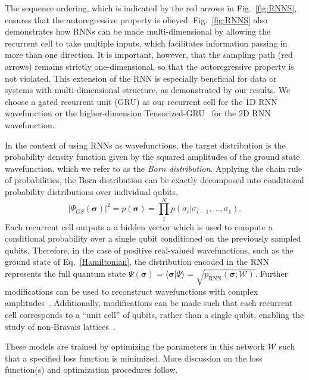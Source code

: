 \documentclass[twocolumn,
                showpacs,
                nofootinbib,
                nobibnotes,
                aps,
                superscriptaddress,
                amssymb,
                amsmath,
                floatfix,
                reprint,
                prx, 
                notitlepage,
                showkeys,
                10pt,
		]{revtex4-2}
\begin{document}
The sequence ordering, which is indicated by the red arrows in Fig.~\ref{fig:RNNS}, ensures that the autoregressive property is obeyed.
Fig.~\ref{fig:RNNS} also demonstrates how RNNs can be made multi-dimensional by allowing the recurrent cell to take multiple inputs, which facilitates information passing in more than one direction. It is important, however, that the sampling path (red arrows) remains strictly one-dimensional, so that the autoregressive property is not violated.
This extension of the RNN is especially beneficial for data or systems with multi-dimensional structure, as demonstrated by our results. 
We choose a gated recurrent unit (GRU) as our recurrent cell \cite{cho-etal-2014-learning} for the 1D RNN wavefunction or the higher-dimension Tensorized-GRU~\cite{hibat2022supplementing} for the 2D RNN wavefunction.

In the context of using RNNs as wavefunctions, the target distribution is the probability density function given by the squared amplitudes of the ground state wavefunction, which we refer to as the \emph{Born distribution}. Applying the chain rule of probabilities, the Born distribution can be exactly decomposed into conditional probability distributions over individual qubits, 
\begin{equation}
    \vert\Psi_{GS}(\boldsymbol{\sigma})\vert^2 = p(\boldsymbol{\sigma}) = \prod_i^N p(\sigma_i\vert\sigma_{i-1},\dots,\sigma_1).
\label{ProbChainRuleSpins}
\end{equation}
Each recurrent cell outputs a a hidden vector which is used to compute a conditional probability over a single qubit conditioned on the previously sampled qubits. Therefore, in the case of positive real-valued wavefunctions, such as the ground state of Eq.~\eqref{Hamiltonian}, the distribution encoded in the RNN represents the full quantum state
$\Psi(\boldsymbol\sigma) = \langle \boldsymbol\sigma\vert\Psi\rangle = \sqrt{p_{\text{RNN}}(\boldsymbol\sigma;\mathcal{W})}$.
Further modifications can be used to reconstruct wavefunctions with complex amplitudes~\cite{hibat2020recurrent}. Additionally, modifications can be made such that each recurrent cell corresponds to a ``unit cell'' of qubits, rather than a single qubit, enabling the study of non-Bravais lattices~\cite{hibat2023investigating}.

These models are trained by optimizing the parameters in this network $\mathcal{W}$ such that a specified loss function is minimized. More discussion on the loss function(s) and optimization procedures follow.
\end{document}
